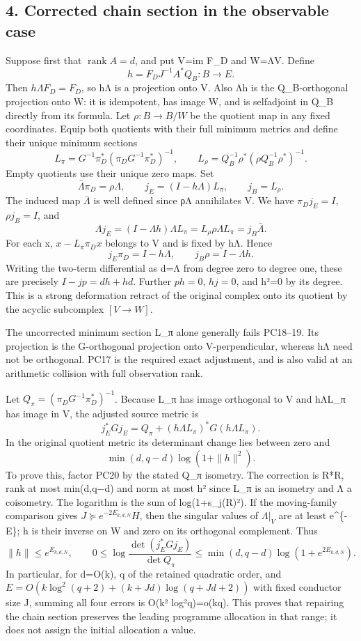 \documentclass[11pt]{article}
\begin{document}
\subsection{4. Corrected chain section in the observable case}\label{corrected-chain-section-in-the-observable-case}

Suppose first that \(\operatorname{rank}A=d\), and put V=im F\_D and W=ΛV. Define \[
h=F_DJ^{-1}A^*Q_B:B\to E.
\tag{PC15}
\] Then \(h\Lambda F_D=F_D\), so hΛ is a projection onto V. Also Λh is the Q\_B-orthogonal projection onto W: it is idempotent, has image W, and is selfadjoint in Q\_B directly from its formula. Let \(\rho:B\to B/W\) be the quotient map in any fixed coordinates. Equip both quotients with their full minimum metrics and define their unique minimum sections \[
L_\pi=G^{-1}\pi_D^*(\pi_DG^{-1}\pi_D^*)^{-1},\qquad
L_\rho=Q_B^{-1}\rho^*(\rho Q_B^{-1}\rho^*)^{-1}.
\tag{PC16}
\] Empty quotients use their unique zero maps. Set \[
\bar\Lambda\pi_D=\rho\Lambda,\qquad
j_E=(I-h\Lambda)L_\pi,\qquad j_B=L_\rho.
\tag{PC17}
\] The induced map \(\bar\Lambda\) is well defined since ρΛ annihilates V. We have \(\pi_Dj_E=I\), \(\rho j_B=I\), and \[
\Lambda j_E=(I-\Lambda h)\Lambda L_\pi
=L_\rho\rho\Lambda L_\pi=j_B\bar\Lambda.
\tag{PC18}
\] For each x, \(x-L_\pi\pi_Dx\) belongs to V and is fixed by hΛ. Hence \[
j_E\pi_D=I-h\Lambda,\qquad j_B\rho=I-\Lambda h.
\tag{PC19}
\] Writing the two-term differential as d=Λ from degree zero to degree one, these are precisely \(I-jp=dh+hd\). Further \(ph=0\), \(hj=0\), and h²=0 by its degree. This is a strong deformation retract of the original complex onto its quotient by the acyclic subcomplex \([V\to W]\).

The uncorrected minimum section L\_π alone generally fails PC18--19. Its projection is the G-orthogonal projection onto V-perpendicular, whereas hΛ need not be orthogonal. PC17 is the required exact adjustment, and is also valid at an arithmetic collision with full observation rank.

Let \(Q_\pi=(\pi_DG^{-1}\pi_D^*)^{-1}\). Because L\_π has image orthogonal to V and hΛL\_π has image in V, the adjusted source metric is \[
j_E^*Gj_E=Q_\pi+(h\Lambda L_\pi)^*G(h\Lambda L_\pi).
\tag{PC20}
\] In the original quotient metric its determinant change lies between zero and \[
\min(d,q-d)\log(1+\|h\|^2).
\tag{PC21}
\] To prove this, factor PC20 by the stated Q\_π isometry. The correction is R*R, rank at most min(d,q−d) and norm at most \textbar\textbar h\textbar\textbar² since L\_π is an isometry and Λ a coisometry. The logarithm is the sum of log(1+s\_j(R)²). If the moving-family comparison gives \(J\succeq e^{-2E_{k,d,N}}H\), then the singular values of \(\Lambda|_V\) are at least e\^{}\{-E\}; h is their inverse on W and zero on its orthogonal complement. Thus \[
\|h\|\le e^{E_{k,d,N}},\qquad
0\le\log\frac{\det(j_E^*Gj_E)}{\det Q_\pi}
\le\min(d,q-d)\log(1+e^{2E_{k,d,N}}).
\tag{PC22}
\] In particular, for d=O(k), q of the retained quadratic order, and \(E=O(k\log^2(q+2)+(k+Jd)\log(q+Jd+2))\) with fixed conductor size J, summing all four errors is O(k² log²q)=o(kq). This proves that repairing the chain section preserves the leading programme allocation in that range; it does not assign the initial allocation a value.
\end{document}
